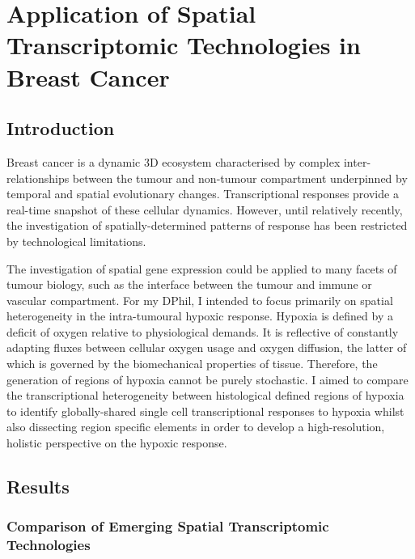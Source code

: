 \chapter{\label{ch:3}Application of Spatial Transcriptomic Technologies in Breast Cancer}

\minitoc

\section{Introduction}
Breast cancer is a dynamic 3D ecosystem characterised by complex inter-relationships between the tumour and non-tumour compartment underpinned by temporal and spatial evolutionary changes. Transcriptional responses provide a real-time snapshot of these cellular dynamics. However, until relatively recently, the investigation of spatially-determined patterns of response has been restricted by technological limitations.

The investigation of spatial gene expression could be applied to many facets of tumour biology, such as the interface between the tumour and immune or vascular compartment. For my DPhil, I intended to focus primarily on spatial heterogeneity in the intra-tumoural hypoxic response. Hypoxia is defined by a deficit of oxygen relative to physiological demands. It is reflective of constantly adapting fluxes between cellular oxygen usage and oxygen diffusion, the latter of which is governed by the biomechanical properties of tissue. Therefore, the generation of regions of hypoxia cannot be purely stochastic. I aimed to compare the transcriptional heterogeneity between histological defined regions of hypoxia to identify globally-shared single cell transcriptional responses to hypoxia whilst also dissecting region specific elements in order to develop a high-resolution, holistic perspective on the hypoxic response.

\section{Results}


\subsection{Comparison of Emerging Spatial Transcriptomic Technologies}

